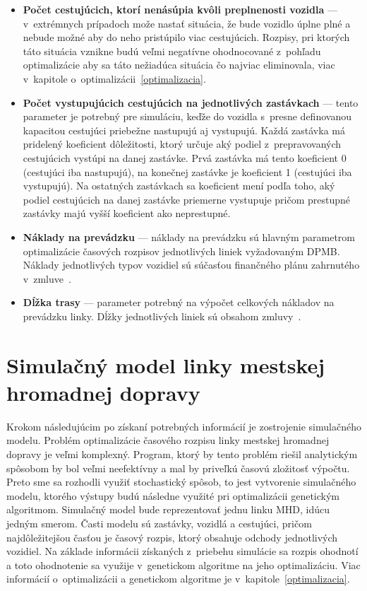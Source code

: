 \begin{itemize}
  \item \textbf{Počet cestujúcich, ktorí nenásúpia kvôli preplnenosti vozidla} --- v~extrémnych prípadoch može nastať situácia, že bude vozidlo úplne plné a nebude možné aby do neho pristúpilo viac cestujúcich. Rozpisy, pri ktorých táto situácia vznikne budú veľmi negatívne ohodnocované z~pohľadu optimalizácie aby sa táto nežiadúca situácia čo najviac eliminovala, viac v~kapitole o~optimalizácii~\ref{optimalizacia}.
  \item \textbf{Počet vystupujúcich cestujúcich na jednotlivých zastávkach} --- tento parameter je potrebný pre simuláciu, keďže do vozidla s~presne definovanou kapacitou cestujúci priebežne nastupujú aj vystupujú. Každá zastávka má pridelený koeficient dôležitosti, ktorý určuje aký podiel z~prepravovaných cestujúcich vystúpi na danej zastávke. Prvá zastávka má tento koeficient 0 (cestujúci iba nastupujú), na konečnej zastávke je koeficient 1 (cestujúci iba vystupujú). Na ostatných zastávkach sa koeficient mení podľa toho, aký podiel cestujúcich na danej zastávke priemerne vystupuje pričom prestupné zastávky majú vyšší koeficient ako neprestupné.
  \item \textbf{Náklady na prevádzku} --- náklady na prevádzku sú hlavným parametrom optimalizácie časových rozpisov jednotlivých liniek vyžadovaným DPMB. Náklady jednotlivých typov vozidiel sú súčasťou finančného plánu zahrnutého v~zmluve~\cite{brno_dpmb_smlouva_2023}.
  \item \textbf{Dĺžka trasy} --- parameter potrebný na výpočet celkových nákladov na prevádzku linky. Dĺžky jednotlivých liniek sú obsahom zmluvy~\cite{brno_dpmb_smlouva_2023}.
\end{itemize}

\chapter{Simulačný model linky mestskej hromadnej dopravy}\label{simulacny_model}

Krokom následujúcim po získaní potrebných informácií je zostrojenie simulačného modelu.
Problém optimalizácie časového rozpisu linky mestskej hromadnej dopravy je veľmi komplexný.
Program, ktorý by tento problém riešil analytickým spôsobom by bol veľmi neefektívny a mal by priveľkú časovú zložitosť výpočtu.
Preto sme sa rozhodli využiť stochastický spôsob, to jest vytvorenie simulačného modelu, ktorého výstupy budú následne využité pri optimalizácii genetickým algoritmom.
Simulačný model bude reprezentovať jednu linku MHD, idúcu jedným smerom.
Časti modelu sú zastávky, vozidlá a cestujúci, pričom najdôležitejšou časťou je časový rozpis, ktorý obsahuje odchody jednotlivých vozidiel.
Na základe informácii získaných z~priebehu simulácie sa rozpis ohodnotí a toto ohodnotenie sa využije v~genetickom algoritme na jeho optimalizáciu.
Viac informácií o~optimalizácii a genetickom algoritme je v~kapitole~\ref{optimalizacia}.

